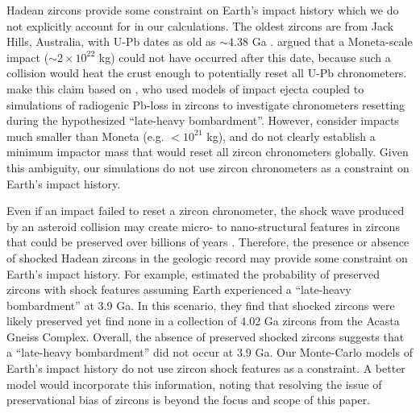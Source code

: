 \documentclass{Liebert_Author}
\begin{document}
Hadean zircons provide some constraint on Earth's impact history which we do not explicitly account for in our calculations. The oldest zircons are from Jack Hills, Australia, with U-Pb dates as old as $\sim 4.38$ Ga \citep{Valley_2014}. \citet{Benner_2020} argued that a Moneta-scale impact ($\sim 2 \times 10^{22}$ kg) could not have occurred after this date, because such a collision would heat the crust enough to potentially reset all U-Pb chronometers. \citet{Benner_2020} make this claim based on \citet{Abramov_2013}, who used models of impact ejecta coupled to simulations of radiogenic Pb-loss in zircons to investigate chronometers resetting during the hypothesized ``late-heavy bombardment''. However, \citet{Abramov_2013} consider impacts much smaller than Moneta (e.g. $< 10^{21}$ kg), and do not clearly establish a minimum impactor mass that would reset all zircon chronometers globally. Given this ambiguity, our simulations do not use zircon chronometers as a constraint on Earth's impact history.

Even if an impact failed to reset a zircon chronometer, the shock wave produced by an asteroid collision may create micro- to nano-structural features in zircons that could be preserved over billions of years \citep{Reimink_2023}. Therefore, the presence or absence of shocked Hadean zircons in the geologic record may provide some constraint on Earth's impact history. For example, \citet{Reimink_2023} estimated the probability of preserved zircons with shock features assuming Earth experienced a ``late-heavy bombardment'' at 3.9 Ga. In this scenario, they find that shocked zircons were likely preserved yet find none in a collection of 4.02 Ga zircons from the Acasta Gneiss Complex. Overall, the absence of preserved shocked zircons suggests that a ``late-heavy bombardment'' did not occur at 3.9 Ga. Our Monte-Carlo models of Earth's impact history do not use zircon shock features as a constraint. A better model would incorporate this information, noting that resolving the issue of preservational bias of zircons is beyond the focus and scope of this paper.
\end{document}
